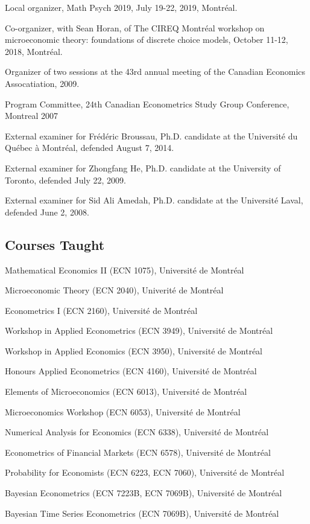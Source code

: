 \documentclass[12pt]{article}
\begin{document}
Local organizer, Math Psych 2019, July 19-22, 2019, Montr\'eal.

Co-organizer, with Sean Horan, of 
The CIREQ Montr\'eal workshop on microeconomic theory: foundations of discrete choice models, October 11-12, 2018, Montr\'eal.

Organizer of two sessions at the 43rd annual meeting of the Canadian Economics Assocatiation, 2009.

Program Committee, 24th Canadian Econometrics Study Group Conference, Montreal 2007

External examiner for Fr\'ed\'eric Broussau,
Ph.D. candidate at the Universit\'e du Qu\'ebec \`a Montr\'eal,
defended August 7, 2014.

External examiner for Zhongfang He,
Ph.D. candidate at the University of Toronto,
defended July 22, 2009.

External examiner for Sid Ali Amedah,
Ph.D. candidate at the Universit\'e Laval,
defended June 2, 2008.

\subsection*{Courses Taught}

Mathematical Economics II (ECN 1075), Universit\'e de Montr\'eal

Microeconomic Theory (ECN 2040), Univerit\'e de Montr\'eal

Econometrics I (ECN 2160), Universit\'e de Montr\'eal

Workshop in Applied Econometrics (ECN 3949), Universit\'e de Montr\'eal

Workshop in Applied Economics (ECN 3950), Universit\'e de Montr\'eal

Honours Applied Econometrics (ECN 4160), Universit\'e de Montr\'eal

Elements of Microeconomics (ECN 6013), Universit\'e de Montr\'eal

Microeconomics Workshop (ECN 6053), Universit\'e de Montr\'eal

Numerical Analysis for Economics (ECN 6338), Universit\'e de Montr\'eal

Econometrics of Financial Markets (ECN 6578), Universit\'e de Montr\'eal

Probability for Economists (ECN 6223, ECN 7060), Universit\'e de Montr\'eal

Bayesian Econometrics (ECN 7223B, ECN 7069B), Universit\'e de Montr\'eal

Bayesian Time Series Econometrics (ECN 7069B), Universit\'e de Montr\'eal
\end{document}
